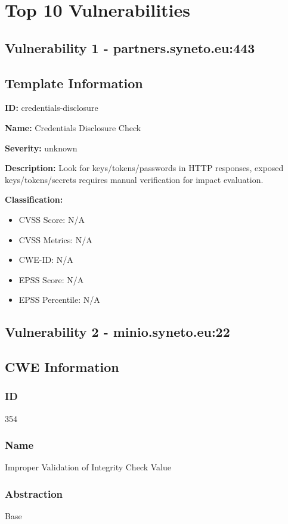 \chapter{Top 10 Vulnerabilities}

\section*{Vulnerability 1 - partners.syneto.eu:443}

\section*{Template Information}
\textbf{ID:} credentials-disclosure

\textbf{Name:} Credentials Disclosure Check

\textbf{Severity:} unknown

\textbf{Description:} Look for keys/tokens/passwords in HTTP responses, exposed keys/tokens/secrets requires manual verification for impact evaluation.

\textbf{Classification:}
\begin{itemize}
\item CVSS Score: N/A
\item CVSS Metrics: N/A
\item CWE-ID: N/A
\item EPSS Score: N/A
\item EPSS Percentile: N/A
\end{itemize}



\section*{Vulnerability 2 - minio.syneto.eu:22}

\section*{CWE Information}
\subsection*{ID}
354

\subsection*{Name}
Improper Validation of Integrity Check Value

\subsection*{Abstraction}
Base

